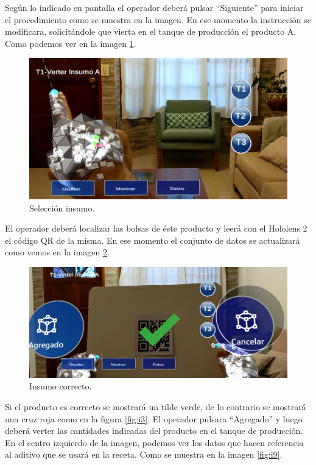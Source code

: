 Según lo indicado en pantalla el operador deberá pulsar ``Siguiente'' para iniciar el procedimiento como se muestra en la imagen. En ese momento la instrucción se modificara, solicitándole que vierta en el tanque de producción el producto A. Como podemos ver en la imagen \ref{fig:i7}.

\begin{figure}[htpb]
	\centering
	\includegraphics[scale=.5]{./Figures/i7.PNG}
	\caption{Selección insumo\protect\footnotemark.}
	\label{fig:i7}
\end{figure}

El operador deberá localizar las bolsas de éste producto y leerá con el Hololens 2 el código QR de la misma. En ese momento el conjunto de datos se actualizará como vemos en la imagen \ref{fig:i8}.

\begin{figure}[htpb]
	\centering
	\includegraphics[scale=.5]{./Figures/i8.PNG}
	\caption{Insumo correcto\protect\footnotemark.}
	\label{fig:i8}
\end{figure}

Si el producto es correcto se mostrará un tilde verde, de lo contrario se mostrará una cruz roja como en la figura \ref{fig:i3}. El operador pulsara ``Agregado'' y luego deberá verter las cantidades indicadas del producto en el tanque de producción. En el centro izquierdo de la imagen, podemos ver los datos que hacen referencia al aditivo que se usará en la receta. Como se muestra en la imagen \ref{fig:i9}.

